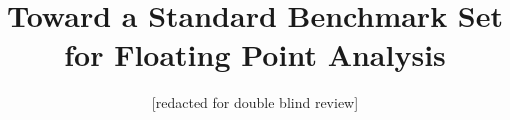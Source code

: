 \documentclass{llncs}
\begin{document}
\title{Toward a Standard Benchmark Set for Floating Point Analysis}
\author{[redacted for double blind review]}
\maketitle







\end{document}
